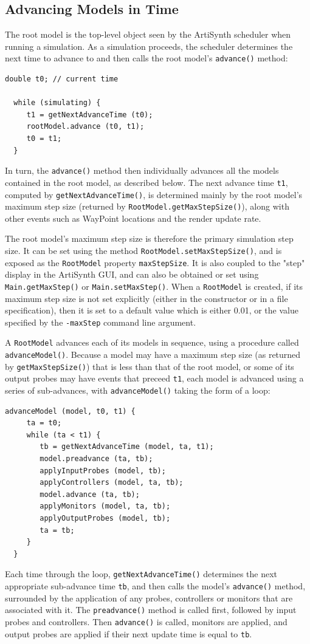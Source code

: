 \documentclass{article}
\begin{document}
\subsection{Advancing Models in Time}

The root model is the top-level object seen by the ArtiSynth scheduler
when running a simulation. As a simulation proceeds, the scheduler determines
the next time to advance to and then calls the root model's {\tt advance()}
method:
\begin{lstlisting}[]
  double t0; // current time

  while (simulating) {
     t1 = getNextAdvanceTime (t0);
     rootModel.advance (t0, t1);
     t0 = t1;
  }
\end{lstlisting}

In turn, the {\tt advance()} method then individually advances all the
models contained in the root model, as described below.  The next
advance time {\tt t1}, computed by {\tt getNextAdvanceTime()}, is
determined mainly by the root model's maximum step size (returned by
{\tt RootModel.getMaxStep\-Size()}), along with other events such as
WayPoint locations and the render update rate.

The root model's maximum step size is therefore the primary simulation
step size. It can be set using the method
{\tt RootModel.setMaxStepSize()}, and is exposed as the {\tt RootModel}
property {\tt maxStepSize}.  It is also coupled to the "step" display in
the ArtiSynth GUI, and can also be obtained or set using
{\tt Main.getMaxStep()} or {\tt Main.setMaxStep()}. When a {\tt RootModel} is
created, if its maximum step size is not set explicitly (either in the
constructor or in a file specification), then it is set to a default
value which is either 0.01, or the value specified by the {\tt -maxStep}
command line argument.

A {\tt RootModel} advances each of its models in sequence, using a
procedure called {\tt advanceModel()}. Because a model may have a
maximum step size (as returned by {\tt getMaxStepSize()}) that is less
than that of the root model, or some of its output probes may have
events that preceed {\tt t1}, each model is advanced using
a series of sub-advances, with {\tt advanceModel()} taking the
form of a loop:
\begin{lstlisting}[]
  advanceModel (model, t0, t1) {
     ta = t0;
     while (ta < t1) {
        tb = getNextAdvanceTime (model, ta, t1);
        model.preadvance (ta, tb);
        applyInputProbes (model, tb);
        applyControllers (model, ta, tb);
        model.advance (ta, tb);
        applyMonitors (model, ta, tb);
        applyOutputProbes (model, tb);
        ta = tb;
     }
  }
\end{lstlisting}
Each time through the loop, {\tt getNextAdvanceTime()} determines the
next appropriate sub-advance time {\tt tb}, and then calls the model's
{\tt advance()} method, surrounded by the application of any probes,
controllers or monitors that are associated with it.
The {\tt preadvance()} method is called first, followed
by input probes and controllers.
Then {\tt advance()} is called, monitors are applied, and
output probes are applied if their next update time is equal to
{\tt tb}.
\end{document}
